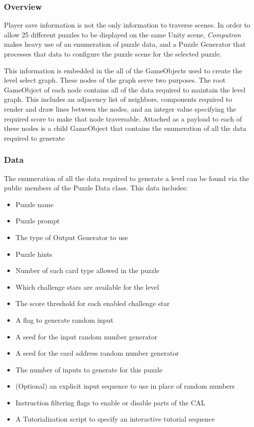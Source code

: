 \subsubsection{Overview}
Player save information is not the only information to traverse scenes. In order to allow 25 different puzzles to be displayed on the same Unity scene, \textit{Computron} makes heavy use of an enumeration of puzzle data, and a Puzzle Generator that processes that data to configure the puzzle scene for the selected puzzle.

This information is embedded in the all of the GameObjects used to create the level select graph. These nodes of the graph serve two purposes. The root GameObject of each node contains all of the data required to maintain the level graph. This includes an adjacency list of neighbors, components required to render and draw lines between the nodes, and an integer value specifying the required score to make that node traversable. Attached as a payload to each of these nodes is a child GameObject that contains the enumeration of all the data required to generate   

\subsubsection{Data}
The enumeration of all the data required to generate a level can be found via the public members of the Puzzle Data class. This data includes:

\begin{itemize}
    \item Puzzle name
    \item Puzzle prompt
    \item The type of Output Generator to use
    \item Puzzle hints
    \item Number of each card type allowed in the puzzle
    \item Which challenge stars are available for the level
    \item The score threshold for each enabled challenge star
    \item A flag to generate random input
    \item A seed for the input random number generator
    \item A seed for the card address random number generator
    \item The number of inputs to generate for this puzzle
    \item (Optional) an explicit input sequence to use in place of random numbers
    \item Instruction filtering flags to enable or disable parts of the CAL 
    \item A Tutorialization script to specify an interactive tutorial sequence
\end{itemize}

